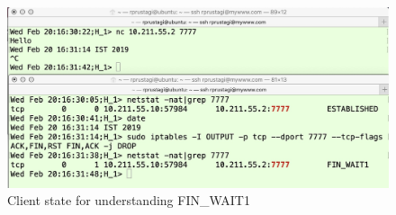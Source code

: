 \begin{figure}[!htb]
\centering
\includegraphics[scale=.22]{src/Figures/chap3/6.jpg}
\caption{Client state for understanding FIN\_WAIT1}\label{chap3-fig6}
\end{figure}


